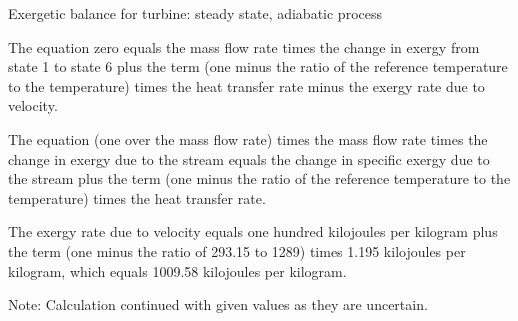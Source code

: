Exergetic balance for turbine: steady state, adiabatic process

The equation zero equals the mass flow rate times the change in exergy from state 1 to state 6 plus the term (one minus the ratio of the reference temperature to the temperature) times the heat transfer rate minus the exergy rate due to velocity.

The equation (one over the mass flow rate) times the mass flow rate times the change in exergy due to the stream equals the change in specific exergy due to the stream plus the term (one minus the ratio of the reference temperature to the temperature) times the heat transfer rate.

The exergy rate due to velocity equals one hundred kilojoules per kilogram plus the term (one minus the ratio of 293.15 to 1289) times 1.195 kilojoules per kilogram, which equals 1009.58 kilojoules per kilogram.

Note: Calculation continued with given values as they are uncertain.